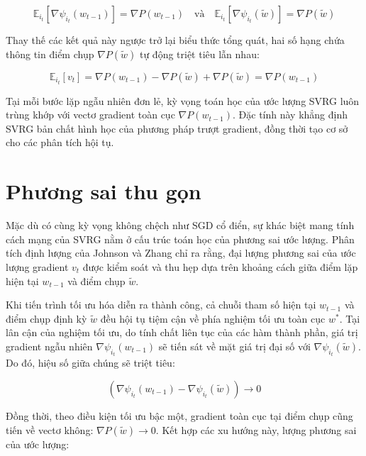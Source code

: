 \begin{equation}

\mathbb{E}_{i_t} \left[ \nabla \psi_{i_t}(w_{t-1}) \right] = \nabla P(w_{t-1}) \quad \text{và} \quad \mathbb{E}_{i_t} \left[ \nabla \psi_{i_t}(\tilde{w}) \right] = \nabla P(\tilde{w})

\end{equation}

Thay thế các kết quả này ngược trở lại biểu thức tổng quát, hai số hạng chứa thông tin điểm chụp $\nabla P(\tilde{w})$ tự động triệt tiêu lẫn nhau:

\begin{equation}
\mathbb{E}_{i_t} \left[ v_t \right] = \nabla P(w_{t-1}) - \nabla P(\tilde{w}) + \nabla P(\tilde{w}) = \nabla P(w_{t-1})
\end{equation}

Tại mỗi bước lặp ngẫu nhiên đơn lẻ, kỳ vọng toán học của ước lượng SVRG luôn trùng khớp với vectơ gradient toàn cục $\nabla P(w_{t-1})$. Đặc tính này khẳng định SVRG bản chất hình học của phương pháp trượt gradient, đồng thời tạo cơ sở cho các phân tích hội tụ.


\section{Phương sai thu gọn}


Mặc dù có cùng kỳ vọng không chệch như SGD cổ điển, sự khác biệt mang tính cách mạng của SVRG nằm ở cấu trúc toán học của phương sai ước lượng. Phân tích định lượng của Johnson và Zhang \cite{johnson2013accelerating} chỉ ra rằng, đại lượng phương sai của ước lượng gradient $v_t$ được kiểm soát và thu hẹp dựa trên khoảng cách giữa điểm lặp hiện tại $w_{t-1}$ và điểm chụp $\tilde{w}$.



Khi tiến trình tối ưu hóa diễn ra thành công, cả chuỗi tham số hiện tại $w_{t-1}$ và điểm chụp định kỳ $\tilde{w}$ đều hội tụ tiệm cận về phía nghiệm tối ưu toàn cục $w^*$. Tại lân cận của nghiệm tối ưu, do tính chất liên tục của các hàm thành phần, giá trị gradient ngẫu nhiên $\nabla \psi_{i_t}(w_{t-1})$ sẽ tiến sát về mặt giá trị đại số với $\nabla \psi_{i_t}(\tilde{w})$. Do đó, hiệu số giữa chúng sẽ triệt tiêu:

\begin{equation}
\left( \nabla \psi_{i_t}(w_{t-1}) - \nabla \psi_{i_t}(\tilde{w}) \right) \to 0
\end{equation}

Đồng thời, theo điều kiện tối ưu bậc một, gradient toàn cục tại điểm chụp cũng tiến về vectơ không: $\nabla P(\tilde{w}) \to 0$. Kết hợp các xu hướng này, lượng phương sai của ước lượng:

